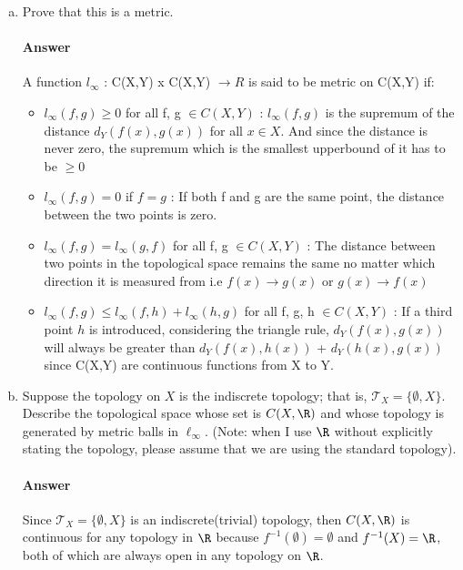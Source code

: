 \documentclass{article}
\begin{document}
\begin{enumerate}[(a)]
    \item Prove that this is a metric.

        \paragraph{Answer}
          A function $l_\infty$ : C(X,Y) x C(X,Y) $\to R$ is said to be metric on C(X,Y) if:
          
          \begin{itemize}
          	\item $l_\infty(f, g) \geq 0$ for all f, g $\in C(X,Y)$ : $l_\infty(f, g)$ is the supremum of the distance $d_Y(f(x), g(x))$ for all $x \in X$. And since the distance is never zero, the supremum which is the smallest upperbound of it has to be $\geq 0$          	
          	\item $l_\infty(f, g) = 0$ if $f =g$ : If both f and g are the same point, the distance between the two points is zero. 
          	\item $l_\infty(f, g) = l_\infty(g, f)$ for all f, g $\in C(X,Y)$ : The distance between two points in the topological space remains the same no matter which direction it is measured from i.e $f(x) \to g(x)$ or $g(x) \to f(x)$          	
          	\item $l_\infty(f, g) \leq l_\infty(f, h) + l_\infty(h, g)$ for all f, g, h $\in C(X,Y)$ : If a third point $h$ is introduced, considering the triangle rule, $d_Y(f(x), g(x))$ will always be greater than  $d_Y(f(x), h(x))$ +  $d_Y(h(x), g(x))$ since C(X,Y) are continuous functions from X to Y. 
          \end{itemize}
                

    \item Suppose the topology on $X$ is the indiscrete topology; that is,
        $\mathcal{T}_X=\{\emptyset,X\}$.  Describe the topological space whose
        set is $C(X,\R)$ and whose topology is generated by metric balls in
        $\ell_{\infty}$. (Note: when I use $\R$ without explicitly stating the
        topology, please assume that we are using the standard topology).

        \paragraph{Answer}
        Since $\mathcal{T}_X=\{\emptyset,X\}$ is an indiscrete(trivial) topology, then $C(X,\R)$ is continuous for any topology in $\R$ because $f^{-1}(\emptyset) = \emptyset$ and $f^{-1}(X) = \R$, both of which are always open in any topology on $\R$.

\end{enumerate}
\end{document}
